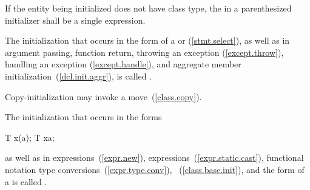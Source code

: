 \pnum
If the entity being initialized does not have class type, the
 in a
parenthesized initializer shall be a single expression.

\pnum
{}%
%
The initialization that occurs in the \tcode{=} form of a
 or
 (\ref{stmt.select}),
as well as in argument passing, function return,
throwing an exception (\ref{except.throw}),
handling an exception (\ref{except.handle}),
and aggregate member initialization~(\ref{dcl.init.aggr}),
is called
.
\begin{note} Copy-initialization may invoke a move~(\ref{class.copy}). \end{note}

\pnum
The initialization that occurs in the forms
\begin{codeblock}
T x(a);
T x{a};
\end{codeblock}
as well as in
expressions~(\ref{expr.new}),
expressions~(\ref{expr.static.cast}),
functional notation type conversions~(\ref{expr.type.conv}),
~(\ref{class.base.init}), and
the  form of a 
is called
.

